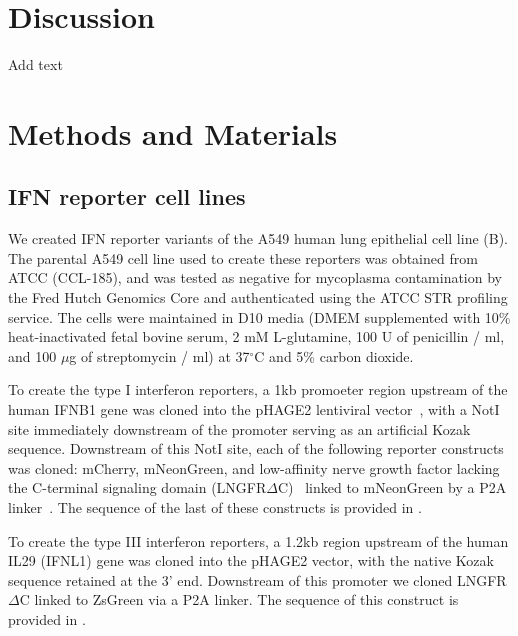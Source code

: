 \documentclass[9pt,lineno]{elife}
\begin{document}
\begin{figure}
\begin{fullwidth}
\label{figdata:mutations}

\end{fullwidth}
\end{figure}

\section{Discussion}

Add text

\section{Methods and Materials}

\subsection{IFN reporter cell lines}
We created IFN reporter variants of the A549 human lung epithelial cell line (B).
The parental A549 cell line used to create these reporters was obtained from ATCC (CCL-185), and was tested as negative for mycoplasma contamination by the Fred Hutch Genomics Core and authenticated using the ATCC STR profiling service.
The cells were maintained in D10 media (DMEM supplemented with 10\% heat-inactivated fetal bovine serum, 2 mM L-glutamine, 100 U of penicillin / ml, and 100 $\mu$g of streptomycin / ml) at 37$^{\circ}$C and 5\% carbon dioxide.

To create the type I interferon reporters, a 1kb promoeter region upstream of the human IFNB1 gene was cloned into the pHAGE2 lentiviral vector~\citep{oconnell2010lentiviral}, with a NotI site immediately downstream of the promoter serving as an artificial Kozak sequence. 
Downstream of this NotI site, each of the following reporter constructs was cloned: mCherry, mNeonGreen, and low-affinity nerve growth factor lacking the C-terminal signaling domain (LNGFR$\Delta$C)~\citep{bonini1997hsv,ruggieri1997cell} linked to mNeonGreen by a P2A linker~\citep{kim2011high}.
The sequence of the last of these constructs is provided in .

To create the type III interferon reporters, a 1.2kb region upstream of the human IL29 (IFNL1) gene was cloned into the pHAGE2 vector, with the native Kozak sequence retained at the 3' end. 
Downstream of this promoter we cloned LNGFR$\Delta$C linked to ZsGreen via a P2A linker.
The sequence of this construct is provided in .
 
\end{document}
